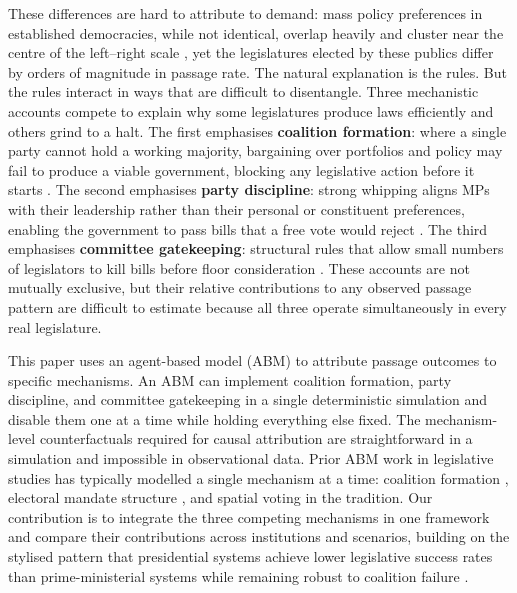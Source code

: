 \documentclass[11pt]{article}
\begin{document}
These differences are hard to attribute to demand: mass policy preferences
in established democracies, while not identical, overlap heavily and cluster
near the centre of the left--right scale \citep{powell2000, caughey2019},
yet the legislatures elected by these publics differ by orders of magnitude in
passage rate. The natural explanation is the rules. But
the rules interact in ways that are difficult to disentangle. Three
mechanistic accounts compete to explain why some legislatures produce laws
efficiently and others grind to a halt. The first emphasises
\textbf{coalition formation}: where a single party cannot hold a working
majority, bargaining over portfolios and policy may fail to produce a
viable government, blocking any legislative action before it starts
\citep{strom1990, laver1990}. The second emphasises \textbf{party
discipline}: strong whipping aligns MPs with their leadership rather than
their personal or constituent preferences, enabling the government to pass
bills that a free vote would reject \citep{bowler1999, cox1993}. The third
emphasises \textbf{committee gatekeeping}: structural rules that allow
small numbers of legislators to kill bills before floor consideration
\citep{shepsle1978, tsebelis2002}. These accounts are not mutually
exclusive, but their relative contributions to any observed passage pattern
are difficult to estimate because all three operate simultaneously in
every real legislature.

This paper uses an agent-based model (ABM) to attribute passage outcomes to
specific mechanisms. An ABM can implement coalition formation, party
discipline, and committee gatekeeping in a single deterministic simulation
and disable them one at a time while holding everything else fixed. The
mechanism-level counterfactuals required for causal attribution are
straightforward in a simulation and impossible in observational data.
Prior ABM work in legislative studies has typically modelled a single
mechanism at a time: coalition formation \citep{laver1990},
electoral mandate structure \citep{fowler2007}, and spatial voting in
the \citet{downs1957} tradition. Our contribution is to integrate the
three competing mechanisms in one framework and compare their
contributions across institutions and scenarios, building on the stylised
pattern that presidential systems achieve lower legislative success rates
than prime-ministerial systems while remaining robust to coalition failure
\citep{shugart2008, saiegh2014}.
\end{document}
